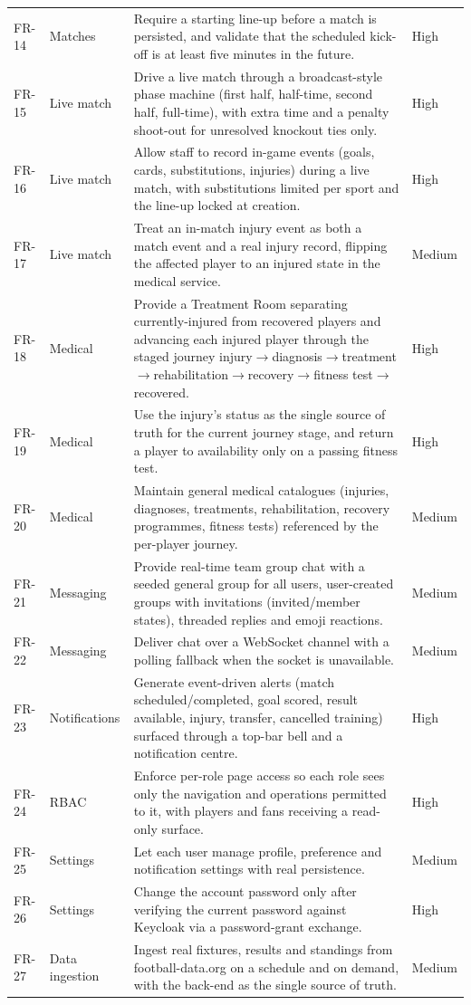 \begin{longtable}{p{} p{} p{} p{}}
FR-14 & Matches & Require a starting line-up before a match is persisted, and validate that the scheduled kick-off is at least five minutes in the future. & High \\
FR-15 & Live match & Drive a live match through a broadcast-style phase machine (first half, half-time, second half, full-time), with extra time and a penalty shoot-out for unresolved knockout ties only. & High \\
FR-16 & Live match & Allow staff to record in-game events (goals, cards, substitutions, injuries) during a live match, with substitutions limited per sport and the line-up locked at creation. & High \\
FR-17 & Live match & Treat an in-match injury event as both a match event and a real injury record, flipping the affected player to an injured state in the medical service. & Medium \\
FR-18 & Medical & Provide a Treatment Room separating currently-injured from recovered players and advancing each injured player through the staged journey injury$\rightarrow$diagnosis$\rightarrow$treatment$\rightarrow$rehabilitation$\rightarrow$recovery$\rightarrow$fitness test$\rightarrow$recovered. & High \\
FR-19 & Medical & Use the injury's status as the single source of truth for the current journey stage, and return a player to availability only on a passing fitness test. & High \\
FR-20 & Medical & Maintain general medical catalogues (injuries, diagnoses, treatments, rehabilitation, recovery programmes, fitness tests) referenced by the per-player journey. & Medium \\
FR-21 & Messaging & Provide real-time team group chat with a seeded general group for all users, user-created groups with invitations (invited/member states), threaded replies and emoji reactions. & Medium \\
FR-22 & Messaging & Deliver chat over a WebSocket channel with a polling fallback when the socket is unavailable. & Medium \\
FR-23 & Notifications & Generate event-driven alerts (match scheduled/completed, goal scored, result available, injury, transfer, cancelled training) surfaced through a top-bar bell and a notification centre. & High \\
FR-24 & RBAC & Enforce per-role page access so each role sees only the navigation and operations permitted to it, with players and fans receiving a read-only surface. & High \\
FR-25 & Settings & Let each user manage profile, preference and notification settings with real persistence. & Medium \\
FR-26 & Settings & Change the account password only after verifying the current password against Keycloak via a password-grant exchange. & High \\
FR-27 & Data ingestion & Ingest real fixtures, results and standings from football-data.org on a schedule and on demand, with the back-end as the single source of truth. & Medium \\
\end{longtable}
